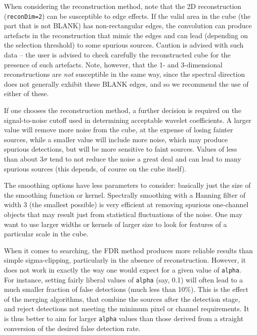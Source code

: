 When considering the reconstruction method, note that the 2D
reconstruction (\texttt{reconDim=2}) can be susceptible to edge
effects. If the valid area in the cube (\ie the part that is not
BLANK) has non-rectangular edges, the convolution can produce
artefacts in the reconstruction that mimic the edges and can lead
(depending on the selection threshold) to some spurious
sources. Caution is advised with such data -- the user is advised to
check carefully the reconstructed cube for the presence of such
artefacts. Note, however, that the 1- and 3-dimensional
reconstructions are \emph{not} susceptible in the same way, since the
spectral direction does not generally exhibit these BLANK edges, and
so we recommend the use of either of these.

If one chooses the reconstruction method, a further decision is
required on the signal-to-noise cutoff used in determining acceptable
wavelet coefficients. A larger value will remove more noise from the
cube, at the expense of losing fainter sources, while a smaller value
will include more noise, which may produce spurious detections, but
will be more sensitive to faint sources. Values of less than about
$3\sigma$ tend to not reduce the noise a great deal and can lead to
many spurious sources (this depends, of course on the cube itself).

The smoothing options have less parameters to consider: basically just
the size of the smoothing function or kernel. Spectrally smoothing
with a Hanning filter of width 3 (the smallest possible) is very
efficient at removing spurious one-channel objects that may result
just from statistical fluctuations of the noise. One may want to use
larger widths or kernels of larger size to look for features of a
particular scale in the cube.

When it comes to searching, the FDR method produces more reliable
results than simple sigma-clipping, particularly in the absence of
reconstruction.  However, it does not work in exactly the way one
would expect for a given value of \texttt{alpha}. For instance,
setting fairly liberal values of \texttt{alpha} (say, 0.1) will often
lead to a much smaller fraction of false detections (\ie much less
than 10\%). This is the effect of the merging algorithms, that combine
the sources after the detection stage, and reject detections not
meeting the minimum pixel or channel requirements.  It is thus better
to aim for larger \texttt{alpha} values than those derived from a
straight conversion of the desired false detection rate.

